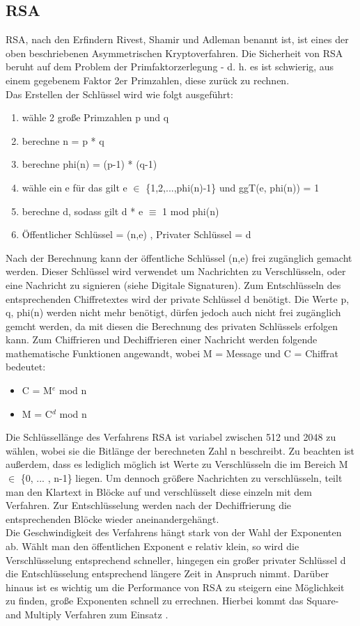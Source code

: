 \documentclass[10pt, a4paper,headsepline]{scrreprt}
\begin{document}
\subsection{RSA}
RSA, nach den Erfindern Rivest, Shamir und Adleman benannt ist, ist eines der oben beschriebenen Asymmetrischen Kryptoverfahren. Die Sicherheit von RSA beruht auf dem Problem der Primfaktorzerlegung - d. h. es ist schwierig, aus einem gegebenem Faktor 2er Primzahlen, diese zurück zu rechnen. \\
Das Erstellen der Schlüssel wird wie folgt ausgeführt: \\
\begin{enumerate}
\item wähle 2 große Primzahlen p und q
\item berechne n = p * q
\item berechne phi(n) = (p-1) * (q-1)
\item wähle ein e für das gilt e $\in$ \{1,2,...,phi(n)-1\} und ggT(e, phi(n)) = 1
\item berechne d, sodass gilt d * e $\equiv$ 1 mod phi(n)
\item Öffentlicher Schlüssel = (n,e) , Privater Schlüssel = d \\
\end{enumerate} 
Nach der Berechnung kann der öffentliche Schlüssel (n,e) frei zugänglich gemacht werden. Dieser Schlüssel wird verwendet um Nachrichten zu Verschlüsseln, oder eine Nachricht zu signieren (siehe Digitale Signaturen). Zum Entschlüsseln des entsprechenden Chiffretextes wird der private Schlüssel d benötigt. Die Werte p, q, phi(n) werden nicht mehr benötigt, dürfen jedoch auch nicht frei zugänglich gemcht werden, da mit diesen die Berechnung des privaten Schlüssels erfolgen kann. Zum Chiffrieren und Dechiffrieren einer Nachricht werden folgende mathematische Funktionen angewandt, wobei M = Message und C = Chiffrat bedeutet: \\
\begin{itemize}
\item C = M$^{e}$ mod n
\item M = C$^{d}$ mod n \\
\end{itemize}
Die Schlüssellänge des Verfahrens RSA ist variabel zwischen 512 und 2048 zu wählen, wobei sie die Bitlänge der berechneten Zahl n beschreibt. Zu beachten ist außerdem, dass es lediglich möglich ist Werte zu Verschlüsseln die im Bereich M $\in$ \{0, ... , n-1\} liegen. Um dennoch größere Nachrichten zu verschlüsseln, teilt man den Klartext in Blöcke auf und verschlüsselt diese einzeln mit dem Verfahren. Zur Entschlüsselung werden nach der Dechiffrierung die entsprechenden Blöcke wieder aneinandergehängt. \\
Die Geschwindigkeit des Verfahrens hängt stark von der Wahl der Exponenten ab. Wählt man den öffentlichen Exponent e relativ klein, so wird die Verschlüsselung entsprechend schneller, hingegen ein großer privater Schlüssel d die Entschlüsselung entsprechend längere Zeit in Anspruch nimmt. Darüber hinaus ist es wichtig um die Performance von RSA zu steigern eine Möglichkeit zu finden, große Exponenten schnell zu errechnen. Hierbei kommt das Square- and Multiply Verfahren zum Einsatz \citep[S. 173ff]{book:understanding-crypto}.
\end{document}
